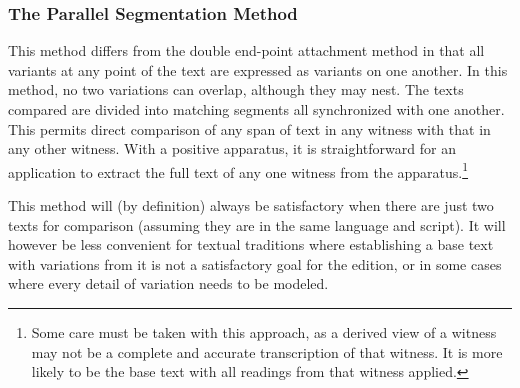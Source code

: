 \subsubsection[{The Parallel Segmentation Method}]{The Parallel Segmentation Method}\label{TCAPPS}\par
This method differs from the double end-point attachment method in that all variants at any point of the text are expressed as variants on one another. In this method, no two variations can overlap, although they may nest. The texts compared are divided into matching segments all synchronized with one another. This permits direct comparison of any span of text in any witness with that in any other witness. With a positive apparatus, it is straightforward for an application to extract the full text of any one witness from the apparatus.\footnote{Some care must be taken with this approach, as a derived view of a witness may not be a complete and accurate transcription of that witness. It is more likely to be the base text with all readings from that witness applied.}\par
This method will (by definition) always be satisfactory when there are just two texts for comparison (assuming they are in the same language and script). It will however be less convenient for textual traditions where establishing a base text with variations from it is not a satisfactory goal for the edition, or in some cases where every detail of variation needs to be modeled.\par

